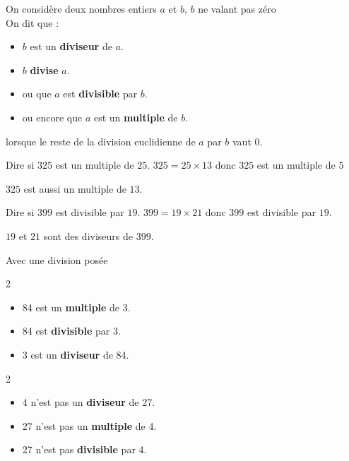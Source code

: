 \begin{changemargin}{-10mm}{-10mm}
	\begin{definition}
		On considère deux nombres entiers $a$ et $b$, $b$ ne valant pas zéro\\
		On dit que :
		\begin{itemize}
			\item $b$ est un \textbf{diviseur} de $a$.
			\item $b$ \textbf{divise} $a$.
			\item ou que $a$ est \textbf{divisible} par $b$.
			\item ou encore que $a$ est un \textbf{multiple} de $b$.
		\end{itemize}
		lorsque le reste de la division euclidienne de $a$ par $b$ vaut $0$.
	\end{definition}

	\begin{exemple}
		Dire si $325$ est un multiple de $25$.
		\correction 
		$325=25\times13$ donc $325$ est un multiple de $5$
	\end{exemple}
	\begin{remarque}
		$325$ est aussi un multiple de $13$.
	\end{remarque}

	\begin{exemple}
		Dire si $399$ est divisible par $19$.
		\correction 
		$399=19\times21$ donc $399$ est divisible par $19$.
	\end{exemple}
	\begin{remarque}
		$19$ et $21$ sont des diviseurs de $399$.
	\end{remarque}

	\begin{exemple*1}
		Avec une division posée

		\begin{multicols}2
			\columnbreak
			\begin{itemize}
				\item 84 est un \textbf{multiple} de 3.
				\item 84 est \textbf{divisible} par 3.
				\item 3 est un \textbf{diviseur} de 84.
			\end{itemize}
		\end{multicols}

		\begin{multicols}2
			\opidiv[displayintermediary=all]{27}{4}
			\columnbreak
			\begin{itemize}
				\item 4 n'est pas un \textbf{diviseur} de 27.
				\item 27 n'est pas un \textbf{multiple} de 4.
				\item 27 n'est pas \textbf{divisible} par 4.
			\end{itemize}
		\end{multicols}	
	\end{exemple*1}
\end{changemargin}
